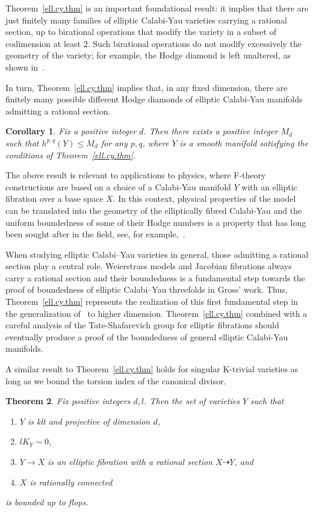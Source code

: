 \documentclass[11pt]{ip-journal}
\newtheorem{theorem}{Theorem}[section]
\newtheorem{corollary}[theorem]{Corollary}
\theoremstyle{definition}
\begin{document}
Theorem~\ref{ell.cy.thm} is an important foundational result: it implies that there are just finitely many families of elliptic Calabi-Yau varieties carrying a rational section, up to birational operations that modify the variety in a subset of codimension at least $2$. 
Such birational operations do not modify excessively the geometry of the variety; for example, the Hodge diamond is left unaltered, as shown in~\cite{MR1672108}. 

In turn, Theorem~\ref{ell.cy.thm} implies that, in any fixed dimension, there are finitely many possible different Hodge diamonds of elliptic Calabi-Yau manifolds admitting a rational section. 


\begin{corollary}
\label{hodge}
Fix a positive integer $d$. 
Then there exists a positive integer 
$M_d$ 
such that 
$h^{p,q}(Y)\leq M_d$ 
for any 
$p,q$, 
where 
$Y$ 
is a smooth manifold satisfying the conditions of Theorem~\ref{ell.cy.thm}.
\end{corollary}

The above result is relevant to applications to physics, where F-theory constructions are based on a choice of a Calabi-Yau manifold $Y$ with an elliptic fibration over a base space $X$. 
In this context, physical properties of the model can be translated into the geometry of the elliptically fibred Calabi-Yau and the uniform boundedness of some of their Hodge numbers is a property that has long been sought after in the field, see, for example,~\cite{MR3464638}.

When studying elliptic Calabi--Yau varieties in general, those admitting a rational section play a central role. 
Weierstrass models and Jacobian fibrations always carry a rational section and their boundedness is a fundamental step towards the proof of boundedness of elliptic Calabi--Yau threefolds in Gross' work. 
Thus, Theorem~\ref{ell.cy.thm} represents the realization of this first fundamental step in the generalization of~\cite{MR1272978} to higher dimension.
Theorem~\ref{ell.cy.thm} combined with a careful analysis of the Tate-Shafarevich group for elliptic fibrations should eventually produce a proof of the boundedness of general elliptic Calabi-Yau manifolds.

A similar result to Theorem~\ref{ell.cy.thm} holds for singular K-trivial varieties as long as we bound the torsion index of the canonical divisor.

\begin{theorem}
\label{ell.cy.thm.gen}
Fix positive integers $d, l$.
Then the set of varieties $Y$ such that
\begin{enumerate}
    \item $Y$ is klt and projective of dimension $d$,
    \item $lK_Y \sim 0$,
    \item $Y \to X$ is an elliptic fibration with a rational section $X \dashrightarrow Y$, and 
    \item $X$ is rationally connected
\end{enumerate}
is bounded up to flops.
\end{theorem}
\end{document}
